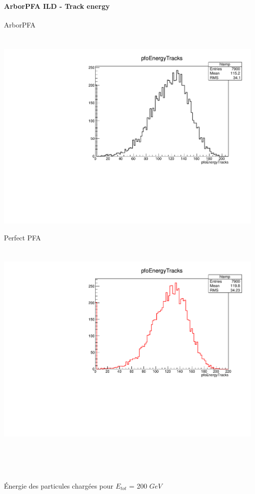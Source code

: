 \documentclass[8pt]{beamer}
\begin{document}
  \begin{frame}
  \frametitle{\backup}
  \framesubtitle{ArborPFA ILD - Track energy}
    \begin{minipage}{0.48\linewidth}
      \begin{center}
        ArborPFA \\
        ~ \\
        ~~~~~\includegraphics[width=\linewidth]{pfoEnergyTracks_ArborPFA.pdf}
      \end{center}
    \end{minipage}
    \begin{minipage}{0.48\linewidth}
      \begin{center}
        Perfect PFA \\
        ~ \\
        ~~~~~\includegraphics[width=\linewidth]{pfoEnergyTracks_PerfectPFA.pdf}
      \end{center}
    \end{minipage}
    ~ \\
    ~ \\
    ~ \\
    \begin{center} Énergie des particules chargées pour $E_{tot}$ = 200 $GeV$ \end{center}
  \end{frame}
\end{document}
